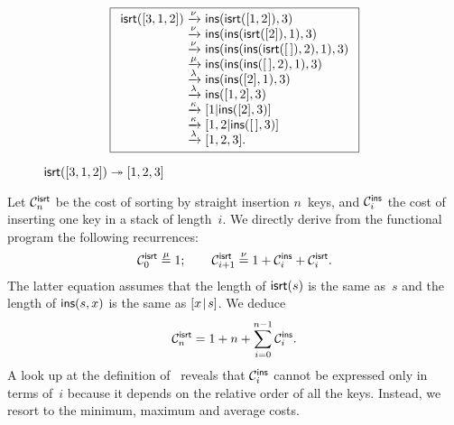 \begin{figure}
\begin{equation*}
\boxed{%
\begin{array}{r@{\;}l@{\;}l}
\fun{isrt}([3,1,2])
& \xrightarrow{\smash{\nu}} & \fun{ins}(\fun{isrt}([1,2]),3)\\
& \xrightarrow{\smash{\nu}}
& \fun{ins}(\fun{ins}(\fun{isrt}([2]),1),3)\\
& \xrightarrow{\smash{\nu}}
& \fun{ins}(\fun{ins}(\fun{ins}(\fun{isrt}(\el),2),1),3)\\
& \xrightarrow{\smash{\mu}}
& \fun{ins}(\fun{ins}(\fun{ins}(\el,2),1),3)\\
& \xrightarrow{\smash{\lambda}}
& \fun{ins}(\fun{ins}([2],1),3)\\
& \xrightarrow{\smash{\lambda}}
& \fun{ins}([1,2],3)\\
& \xrightarrow{\smash{\kappa}}
& [1|\fun{ins}([2],3)]\\
& \xrightarrow{\smash{\kappa}}
& [1,2|\fun{ins}(\el,3)]\\
& \xrightarrow{\smash{\lambda}}
& [1,2,3].
\end{array}}
\end{equation*}
\caption{\(\fun{isrt}([3,1,2]) \twoheadrightarrow [1,2,3]\)
\label{fig:isrt_312}}
\end{figure}

Let \(\C{\fun{isrt}}{n}\) be the cost
of sorting by straight insertion \(n\)~keys, and \(\C{\fun{ins}}{i}\)
the cost of inserting one key in a stack of length~\(i\). We directly
derive from the functional program the following recurrences:
\begin{equation*}
\C{\fun{isrt}}{0}   \eqn{\smash{\mu}} 1;\qquad
\C{\fun{isrt}}{i+1} \eqn{\smash{\nu}} 1 + \C{\fun{ins}}{i} +
  \C{\fun{isrt}}{i}.
\end{equation*}
The latter equation assumes that the length of \(\fun{isrt}(s)\) is
the same as~\(s\) and the length of \(\fun{ins}(s,x)\) is the same as
\(\cons{x}{s}\). We deduce
\begin{equation}
\C{\fun{isrt}}{n} = 1 + n + \sum_{i=0}^{n-1}\C{\fun{ins}}{i}.
\label{eq:cost_isrt}
\end{equation}
A look up at the definition of~ reveals that
\(\C{\fun{ins}}{i}\) cannot be expressed only in terms of~\(i\)
because it depends on the relative order of all the keys. Instead, we
resort to the minimum, maximum and average
costs.

